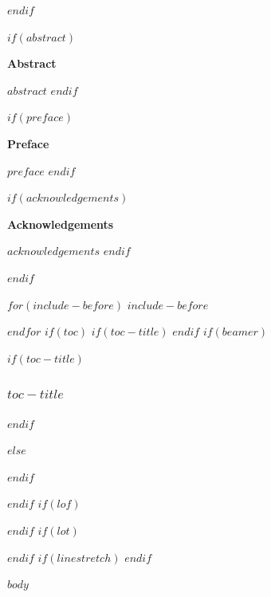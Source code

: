 \documentclass[12pt]{article}
\begin{document}
\tableofcontents

$endif$

\setcounter{section}{0}

$if(abstract)$
\begin{center} %
  {\LARGE \textbf{\textsf{Abstract}}}
\end{center}
$abstract$
\pagebreak
\restoregeometry
$endif$

$if(preface)$

\begin{center} %
  {\LARGE \textbf{\textsf{Preface}}}
\end{center}
$preface$
\pagebreak
\restoregeometry
$endif$

$if(acknowledgements)$
\begin{center} %
  {\LARGE \textbf{\textsf{Acknowledgements}}}
\end{center}
$acknowledgements$
\pagebreak
\restoregeometry
$endif$

$endif$


\pagestyle{custom-header-footer}

$for(include-before)$
$include-before$

$endfor$
$if(toc)$
$if(toc-title)$
\renewcommand*\contentsname{$toc-title$}
$endif$
$if(beamer)$
\begin{frame}[allowframebreaks]
$if(toc-title)$
  \frametitle{$toc-title$}
$endif$
  \tableofcontents[hideallsubsections]
\end{frame}
$else$
{
\tableofcontents
\newpage
}
$endif$

$endif$
$if(lof)$
\newpage
\listoffigures
$endif$
$if(lot)$
\listoftables
$endif$
$if(linestretch)$
$endif$
\sloppy
\setlength{\parindent}{0pt}

\setlength{\parskip}{1em}

$body$
\end{document}
